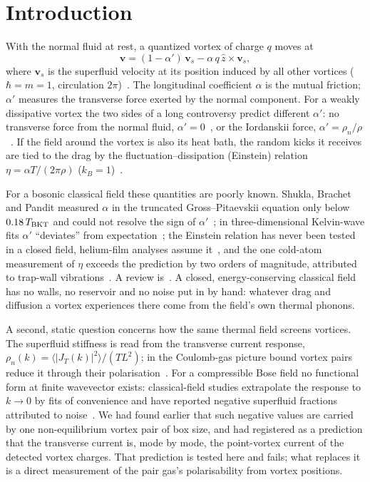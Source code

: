 \documentclass[11pt,a4paper]{article}
\begin{document}
\section{Introduction}

With the normal fluid at rest, a quantized vortex of charge $q$ moves at
\begin{equation}
  \mathbf v=(1-\alpha')\,\mathbf v_s-\alpha\,q\,\hat z\times\mathbf v_s ,
  \label{eq:motion}
\end{equation}
where $\mathbf v_s$ is the superfluid velocity at its position induced by all other vortices
($\hbar=m=1$, circulation $2\pi$)~\cite{Iordanskii1964,Sonin1997}. The longitudinal coefficient $\alpha$ is the
mutual friction; $\alpha'$ measures the transverse force exerted by the normal component. For a weakly dissipative
vortex the two sides of a long controversy predict different $\alpha'$: no transverse force from the normal fluid,
$\alpha'=0$~\cite{ThoulessAoNiu1996}, or the Iordanskii force, $\alpha'=\rho_n/\rho$~\cite{Iordanskii1964,Sonin1997}.
If the field around the vortex is also its heat bath, the random kicks it receives are tied to the drag by the
fluctuation--dissipation (Einstein) relation $\eta=\alpha T/(2\pi\rho)$ ($k_B=1$)~\cite{Mehdi2023}.

For a bosonic classical field these quantities are poorly known. Shukla, Brachet and Pandit measured $\alpha$ in the
truncated Gross--Pitaevskii equation only below $0.18\,T_{\rm BKT}$ and could not resolve the sign of
$\alpha'$~\cite{Shukla2014}; in three-dimensional Kelvin-wave fits $\alpha'$ ``deviates'' from
expectation~\cite{KrstulovicBrachet2023}; the Einstein relation has never been tested in a closed field, helium-film
analyses assume it~\cite{AHNS1980}, and the one cold-atom measurement of $\eta$ exceeds the prediction by two
orders of magnitude, attributed to trap-wall vibrations~\cite{Neely2024}. A review is~\cite{Sergeev2023}. A closed,
energy-conserving classical field has no walls, no reservoir and no noise put in by hand: whatever drag and
diffusion a vortex experiences there come from the field's own thermal phonons.

A second, static question concerns how the same thermal field screens vortices. The superfluid stiffness is read
from the transverse current response, $\rho_n(k)=\langle|J_T(k)|^2\rangle/(TL^2)$; in the Coulomb-gas picture bound
vortex pairs reduce it through their polarisation~\cite{KosterlitzThouless1973,Kosterlitz1974,VallatBeck1994,Faulkner2017}.
For a compressible Bose field no functional form at finite wavevector exists: classical-field studies extrapolate the
response to $k\to0$ by fits of convenience and have reported negative superfluid fractions attributed to
noise~\cite{Foster2010,GawrylukBrewczyk2019}. We had found earlier that such negative values are carried by one
non-equilibrium vortex pair of box size, and had registered as a prediction that the transverse current is, mode by
mode, the point-vortex current of the detected vortex charges. That prediction is tested here and fails; what
replaces it is a direct measurement of the pair gas's polarisability from vortex positions.
\end{document}
